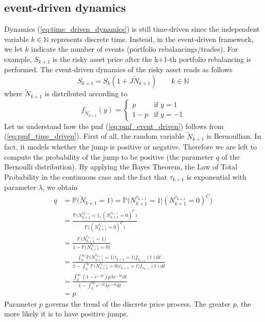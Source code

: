 \subsection{event-driven dynamics}
Dynamics (\ref{eq:time_driven_dynamics}) is still time-driven since the independent variable $k \in \mathbb{N}$ represents discrete time. Instead, in the event-driven framework, we let $k$ indicate the number of events (portfolio rebalancings/trades). For example, $S_{k+1}$ is the risky asset price after the k+1-th portfolio rebalancing is performed. The event-driven dynamics of the risky asset reads as follows
\begin{equation}\label{eq:event_driven_dynamics}
S_{k+1} = S_{k}(1+J \widetilde{N}_{k+1}) \qquad k \in \mathbb{N}
\end{equation}
where $\widetilde{N}_{k+1}$ is distributed according to 
\begin{equation}\label{eq:pmf_event_driven}
f_{\widetilde{N}_{k+1}}(y)  = 
\begin{cases}
p & \text{if } y = 1 \\
1-p & \text{if } y = -1
\end{cases}
\end{equation}
Let us understand how the pmf (\ref{eq:pmf_event_driven}) follows from (\ref{eq:pmf_time_driven}). First of all, the random variable $\widetilde{N}_{k+1}$ is Bernoullian. In fact, it models whether the jump is positive or negative. Therefore we are left to compute the probability of the jump to be positive (the parameter $q$ of the Bernoulli distribution). By applying the Bayes Theorem, the Law of Total Probability in the continuous case and the fact that $\tau_{k+1}$ is exponential with parameter $\lambda$, we obtain
\begin{align*}
q &= \mathbb{P}\big(\widetilde{N}_{k+1} = 1\big) = \mathbb{P}\big(N_{k+1}^{\tau_{k+1}}=1\lvert(N_{k+1}^{\tau_{k+1}}=0)^C\big)\\[1.5ex]
& = \frac{\mathbb{P}\big(N_{k+1}^{\tau_{k+1}}=1,(N_{k+1}^{\tau_{k+1}}=0)^C\big)}{\mathbb{P}\big((N_{k+1}^{\tau_{k+1}}=0)^C\big)}\\[1ex]
&=\frac{\mathbb{P}\big(N_{k+1}^{\tau_{k+1}}=1\big)}{1-\mathbb{P}\big(N_{k+1}^{\tau_{k+1}}=0\big)}\\[1.5ex]
& = \frac{\int_{0}^{\infty}\mathbb{P}\big(N_{k+1}^{\tau_{k+1}} = 1\lvert\tau_{k+1}=t\big)f_{\tau_{k+1}}(t)\mathrm{d}t}{1-\int_{0}^{\infty}\mathbb{P}\big(N_{k+1}^{\tau_{k+1}} = 0\lvert\tau_{k+1}=t\big)f_{\tau_{k+1}}(t)\mathrm{d}t}\\[1.5ex]
& = \frac{\int_{0}^{\infty}(1-e^{-\lambda t})p\lambda e^{-\lambda t} \mathrm{d}t  }{1-\int_{0}^{\infty}e^{-\lambda t}\lambda e^{-\lambda t}\mathrm{d}t } \\[1.5ex]
& = p
\end{align*}
Parameter $p$ governs the trend of the discrete price process. The greater $p$, the more likely it is to have positive jumps.

